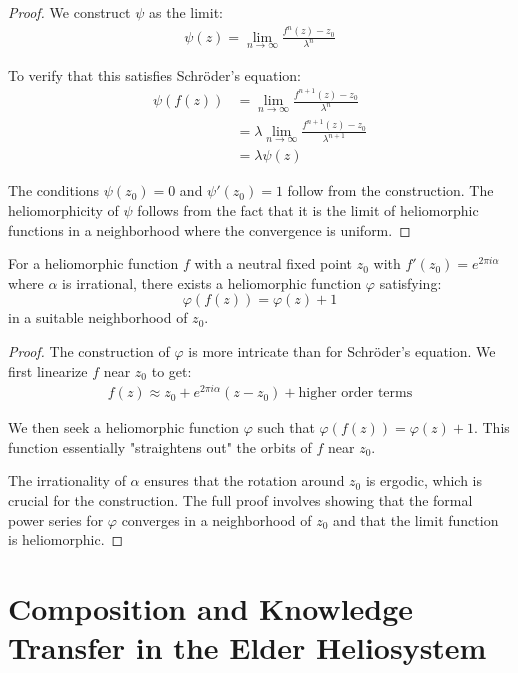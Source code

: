 \begin{proof}
We construct $\psi$ as the limit:
\begin{align}
\psi(z) = \lim_{n\to\infty} \frac{f^n(z) - z_0}{\lambda^n}
\end{align}

To verify that this satisfies Schröder's equation:
\begin{align}
\psi(f(z)) &= \lim_{n\to\infty} \frac{f^{n+1}(z) - z_0}{\lambda^n}\\
&= \lambda \lim_{n\to\infty} \frac{f^{n+1}(z) - z_0}{\lambda^{n+1}}\\
&= \lambda \psi(z)
\end{align}

The conditions $\psi(z_0) = 0$ and $\psi'(z_0) = 1$ follow from the construction. The heliomorphicity of $\psi$ follows from the fact that it is the limit of heliomorphic functions in a neighborhood where the convergence is uniform.
\end{proof}

\begin{theorem}
For a heliomorphic function $f$ with a neutral fixed point $z_0$ with $f'(z_0) = e^{2\pi i \alpha}$ where $\alpha$ is irrational, there exists a heliomorphic function $\varphi$ satisfying:
\begin{equation}
\varphi(f(z)) = \varphi(z) + 1
\end{equation}
in a suitable neighborhood of $z_0$.
\end{theorem}

\begin{proof}
The construction of $\varphi$ is more intricate than for Schröder's equation. We first linearize $f$ near $z_0$ to get:
\begin{align}
f(z) \approx z_0 + e^{2\pi i \alpha}(z - z_0) + \text{higher order terms}
\end{align}

We then seek a heliomorphic function $\varphi$ such that $\varphi(f(z)) = \varphi(z) + 1$. This function essentially "straightens out" the orbits of $f$ near $z_0$.

The irrationality of $\alpha$ ensures that the rotation around $z_0$ is ergodic, which is crucial for the construction. The full proof involves showing that the formal power series for $\varphi$ converges in a neighborhood of $z_0$ and that the limit function is heliomorphic.
\end{proof}

\section{Composition and Knowledge Transfer in the Elder Heliosystem}

